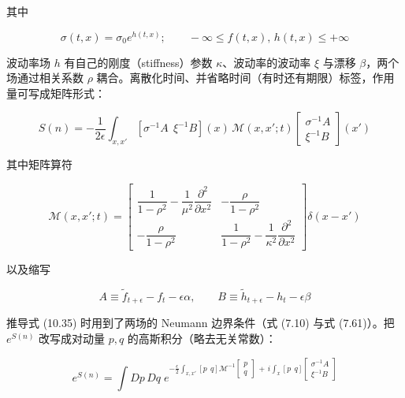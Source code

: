 其中

\begin{equation*}
\sigma(t,x)=\sigma_0e^{h(t,x)};\qquad -\infty\le f(t,x),\,h(t,x)\le+\infty
\end{equation*}

波动率场 $h$ 有自己的刚度（stiffness）参数 $\kappa$、波动率的波动率 $\xi$ 与漂移 $\beta$，两个场通过相关系数 $\rho$ 耦合。离散化时间、并省略时间（有时还有期限）标签，作用量可写成矩阵形式：

\begin{equation*}
S(n)=-\frac{1}{2\epsilon}\int_{x,x'}\left[\sigma^{-1}A\ \ \xi^{-1}B\right](x)\,\mathcal{M}(x,x';t)\begin{bmatrix}\sigma^{-1}A\\ \xi^{-1}B\end{bmatrix}(x')
\tag{10.35}
\end{equation*}

其中矩阵算符

\begin{equation*}
\mathcal{M}(x,x';t)=
\begin{bmatrix}
\dfrac{1}{1-\rho^2}-\dfrac{1}{\mu^2}\dfrac{\partial^2}{\partial x^2} & -\dfrac{\rho}{1-\rho^2}\\[8pt]
-\dfrac{\rho}{1-\rho^2} & \dfrac{1}{1-\rho^2}-\dfrac{1}{\kappa^2}\dfrac{\partial^2}{\partial x^2}
\end{bmatrix}\delta(x-x')
\tag{10.36}
\end{equation*}

以及缩写

\begin{equation*}
A\equiv\tilde{f}_{t+\epsilon}-f_t-\epsilon\alpha,\qquad
B\equiv\tilde{h}_{t+\epsilon}-h_t-\epsilon\beta
\end{equation*}

推导式 (10.35) 时用到了两场的 Neumann 边界条件（式 (7.10) 与式 (7.61)）。把 $e^{S(n)}$ 改写成对动量 $p,q$ 的高斯积分（略去无关常数）：

\begin{equation*}
e^{S(n)}=\int Dp\,Dq\;e^{-\frac{\epsilon}{2}\int_{x,x'}\left[p\ \ q\right]\mathcal{M}^{-1}\begin{bmatrix}p\\ q\end{bmatrix}\,+\,i\int_x\left[p\ \ q\right]\begin{bmatrix}\sigma^{-1}A\\ \xi^{-1}B\end{bmatrix}}
\tag{10.37}
\end{equation*}

